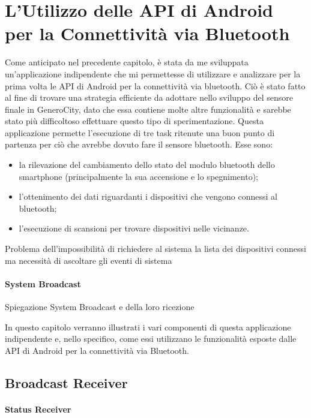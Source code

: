 \chapter{L'Utilizzo delle API di Android per la Connettività via Bluetooth}

Come anticipato nel precedente capitolo, è stata da me sviluppata un'applicazione indipendente che mi permettesse di utilizzare e analizzare per la prima volta le API di Android per la connettività via bluetooth\cite{ref:bluetooth-doc}. Ciò è stato fatto al fine di trovare una strategia efficiente da adottare nello sviluppo del sensore finale in GeneroCity, dato che essa contiene molte altre funzionalità e sarebbe stato più difficoltoso effettuare questo tipo di sperimentazione. Questa applicazione permette l'esecuzione di tre task ritenute una buon punto di partenza per ciò che avrebbe dovuto fare il sensore bluetooth. Esse sono:
\begin{itemize}
    \item la rilevazione del cambiamento dello stato del modulo bluetooth dello smartphone (principalmente la sua accensione e lo spegnimento);
    \item l'ottenimento dei dati riguardanti i dispositivi che vengono connessi al bluetooth;
    \item l'esecuzione di scansioni per trovare dispositivi nelle vicinanze.
\end{itemize}

Problema dell'impossibilità di richiedere al sistema la lista dei dispositivi connessi ma necessità di ascoltare gli eventi di sistema

\subsubsection{System Broadcast}
Spiegazione System Broadcast e della loro ricezione

In questo capitolo verranno illustrati i vari componenti di questa applicazione indipendente e, nello specifico, come essi utilizzano le funzionalità esposte dalle API di Android per la connettività via Bluetooth. 


\section{Broadcast Receiver}

\subsubsection{Status Receiver}

